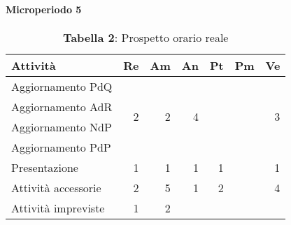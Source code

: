 \paragraph{Microperiodo 5}
\begin{table}[H]
	\centering
	\begin{tabular}{|l|r|r|r|l|l|r|}
		\hline
		\rowcolor{lighter-grayer}
		\textbf{Attività}                                                           & \multicolumn{1}{l|}{\textbf{Re}} & \multicolumn{1}{l|}{\textbf{Am}} & \multicolumn{1}{l|}{\textbf{An}} & \textbf{Pt}            & \textbf{Pm} & \multicolumn{1}{l|}{\textbf{Ve}} \\ \hline
		Aggiornamento PdQ                                                           & \multirow{4}{*}{2}               & \multirow{4}{*}{2}               & \multirow{4}{*}{4}               &                        &             & \multirow{4}{*}{3}               \\ \cline{1-1} \cline{5-6}
		Aggiornamento AdR                                                           &                                  &                                  &                                  &                        &             &                                  \\ \cline{1-1} \cline{5-6}
		Aggiornamento NdP                                                           &                                  &                                  &                                  &                        &             &                                  \\ \cline{1-1} \cline{5-6}
		Aggiornamento PdP                                                           &                                  &                                  &                                  &                        &             &                                  \\ \hline
		Presentazione                                                               & 1                                & 1                                & 1                                & \multicolumn{1}{r|}{1} &             & 1                                \\ \hline
		Attività accessorie & 2                                & 5                                & 1                                & \multicolumn{1}{r|}{2} &             & 4                                \\ \hline
		Attività impreviste                                                         & 1                                & 2                                & \multicolumn{1}{l|}{}            &                        &             & \multicolumn{1}{l|}{}            \\ \hline
	\end{tabular}
\caption*{\textbf{Tabella 2}: Prospetto orario reale\\}
\end{table}

